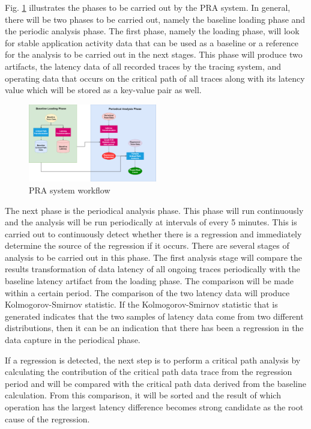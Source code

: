 \documentclass[conference]{configs/IEEEtran}
\begin{document}
Fig. \ref{flow-pra} illustrates the phases to be carried out by the PRA system. In general, there will be two phases to be carried out, namely the baseline loading phase
and the periodic analysis phase. The first phase, namely the loading phase, will look for stable application activity data that can be used as a baseline or a reference for the analysis to be carried out in the next stages. This phase
will produce two artifacts, the latency data of all recorded traces by the tracing system, and operating data that occurs on the critical path of all traces along with its latency value which will be stored as a key-value pair as well.
\begin{figure}[!htb]
	\centering
	\includegraphics[width=0.5\textwidth,scale=5]{resources/ch3/alur_v2.png}
	\caption{PRA system workflow}
	\label{flow-pra}
\end{figure}

The next phase is the periodical analysis phase. This phase will run continuously and the analysis will be run periodically at intervals of every 5 minutes. This is carried out to continuously detect whether there is a regression and
immediately determine the source of the regression if it occurs. There are several stages of analysis
to be carried out in this phase. The first analysis stage will compare the results transformation of data latency of all ongoing traces periodically with the baseline latency artifact from the loading phase. The comparison will be made within a certain period. The comparison of the two latency data will produce Kolmogorov-Smirnov statistic. If the Kolmogorov-Smirnov statistic that is generated indicates that the two samples of latency data come from two different distributions, then it can be an indication that there has been a regression in the data capture in the periodical phase.

If a regression is detected, the next step is to perform a critical path analysis by calculating the contribution of the critical path data trace from the regression period and will be compared with the critical path data derived from the baseline calculation. From this comparison, it will be sorted and the result of which operation has the largest latency difference becomes strong candidate as the root cause of the regression.
\end{document}
